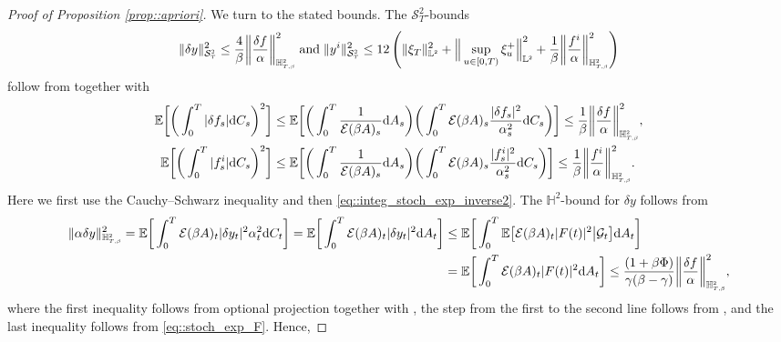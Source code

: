\documentclass[10pt]{article} %
\newcommand\cE{\mathcal E}
\newcommand\cG{\mathcal G}
\newcommand\cS{\mathcal S}
\newcommand{\smalltext}[1]{\text{\fontsize{4}{4}\selectfont$#1$}}
\def \E{\mathbb{E}}
\def \H{\mathbb{H}}
\def \L{\mathbb{L}}
\newcommand{\1}{\mathbf{1}}
\def\d{\mathrm{d}}
\begin{document}
\begin{proof}[Proof of Proposition \ref{prop::apriori}]
\medskip
We turn to the stated bounds. The $\cS^2_T$-bounds
\begin{equation}\label{eq::S2T_bounds_proof}
	\|\delta y\|^2_{\cS^\smalltext{2}_\smalltext{T}} \leq \frac{4}{\beta} \bigg\| \frac{\delta f}{\alpha} \bigg\|^2_{\H^{\smalltext{2}}_{\smalltext{T}\smalltext{,}\smalltext{\beta}}} \; \text{and} \; \|y^i\|^2_{\cS^\smalltext{2}_\smalltext{T}} \leq 12 \, \Bigg(\|\xi_T\|^2_{\L^\smalltext{2}} + \Big\|\sup_{u \in [0,T)} \xi^+_u\Big\|^2_{\L^\smalltext{2}} +  \frac{1}{\beta}\bigg\|\frac{f^i}{\alpha}\bigg\|^2_{\H^\smalltext{2}_{\smalltext{T}\smalltext{,}\smalltext{\beta}}}\Bigg)
\end{equation}
follow from  together with
\begin{align}
	\E\bigg[\bigg(\int_0^T |\delta f_s| \d C_s \bigg)^2\bigg] &\leq \E\bigg[\bigg(\int_0^T \frac{1}{\cE(\beta A)_s}\d A_s\bigg)\bigg(\int_0^T \cE(\beta A)_s\frac{|\delta f_s|^2}{\alpha^2_s} \d C_s \bigg)\bigg] \leq \frac{1}{\beta} \bigg\|\frac{\delta f}{\alpha}\bigg\|^2_{\H^\smalltext{2}_{\smalltext{T}\smalltext{,}\smalltext{\beta}}},\label{eq::bound_integral_delta_f}\\
	\E\bigg[\bigg(\int_0^T |f^i_s| \d C_s \bigg)^2\bigg] &\leq \E\bigg[\bigg(\int_0^T \frac{1}{\cE(\beta A)_s}\d A_s\bigg)\bigg(\int_0^T \cE(\beta A)_s\frac{|f^i_s|^2}{\alpha^2_s} \d C_s \bigg)\bigg] \leq \frac{1}{\beta} \bigg\|\frac{f^i}{\alpha}\bigg\|^2_{\H^\smalltext{2}_{\smalltext{T}\smalltext{,}\smalltext{\beta}}}. \label{eq::bound_integral_f}
\end{align}
Here we first use the Cauchy--Schwarz inequality and then \eqref{eq::integ_stoch_exp_inverse2}.
The $\H^2$-bound for $\delta y$ follows from
\begin{align*}
	\|\alpha \delta y\|^2_{\H^\smalltext{2}_{\smalltext{T}\smalltext{,}\smalltext{\beta}}} = \E \bigg[ \int_0^T \cE(\beta A)_t |\delta y_t|^2 \alpha^2_t \d C_t \bigg] 
	= \E \bigg[ \int_0^T \cE(\beta A)_t |\delta y_{t}|^2 \d A_t \bigg] 
&\leq \E \bigg[ \int_0^T \E \big[ \cE(\beta A)_t |F(t)|^2 \big| \cG_{t} \big] \d A_t \bigg] \\
	&= \E \bigg[ \int_0^T \cE(\beta A)_t |F(t)|^2 \d A_t \bigg]
	\leq \frac{(1+\beta\Phi)}{\gamma(\beta - \gamma)} \bigg\| \frac{\delta f}{\alpha} \bigg\|^2_{\H^{\smalltext{2}}_{\smalltext{T}\smalltext{,}\smalltext{\beta}}},
\end{align*}
where the first inequality follows from optional projection together with , the step from the first to the second line follows from \cite[Theorem VI.57]{dellacherie1982probabilities}, and the last inequality follows from \eqref{eq::stoch_exp_F}. Hence,

\end{proof}
\end{document}

